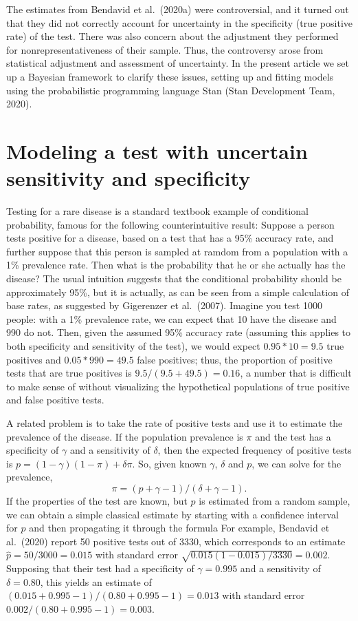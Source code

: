 \documentclass[11pt]{article}
\begin{document}
The estimates from Bendavid et al.\ (2020a) were controversial, and it turned out that they did not correctly account for uncertainty in the specificity (true positive rate) of the test.  There was also concern about the adjustment they performed for nonrepresentativeness of their sample.  Thus, the controversy arose from statistical adjustment and assessment of uncertainty.  In the present article we set up a Bayesian framework to clarify these issues, setting up and fitting models using the probabilistic programming language Stan (Stan Development Team, 2020).


\section{Modeling a test with uncertain sensitivity and specificity}\label{model1}

Testing for a rare disease is a standard textbook example of conditional probability, famous for the following counterintuitive result:  Suppose a person tests positive for a disease, based on a test that has a 95\% accuracy rate, and further suppose that this person is sampled at ramdom from a population with a 1\% prevalence rate.  Then what is the probability that he or she actually has the disease? The usual intuition suggests that the conditional probability should be approximately 95\%, but it is actually, as can be seen from a simple calculation of base rates, as suggested by Gigerenzer et al.\ (2007).  Imagine you test 1000  people:  with a 1\% prevalence rate, we can expect that 10 have the disease and 990 do not.  Then, given the assumed 95\% accuracy rate (assuming this applies to both specificity and sensitivity of the test), we would expect $0.95*10=9.5$ true positives and $0.05*990 =  49.5$ false positives; thus, the proportion of positive tests that are true positives is $9.5/(9.5+49.5) = 0.16$, a number that is difficult to make sense of without visualizing the hypothetical populations of true positive and false positive tests.

A related problem is to take the rate of positive tests and use it to estimate the prevalence of the disease.  If the population prevalence is $\pi$ and the test has a specificity of $\gamma$ and a sensitivity of $\delta$, then the expected frequency of positive tests is $p=(1-\gamma)(1- \pi)+ \delta\pi$.  So, given known $\gamma$, $\delta$ and $p$, we can solve for the prevalence,
\begin{equation}\label{solve}
  \pi=(p + \gamma - 1)/(\delta + \gamma - 1).
  \end{equation}
  If the properties of the test are known, but $p$ is estimated from a random sample, we can obtain a simple classical estimate by starting with a confidence interval for $p$ and then propagating it through the formula  For example, Bendavid et al.\ (2020) report 50 positive tests out of 3330, which corresponds to an estimate  $\hat{p}=50/3000=0.015$ with standard error $\sqrt{0.015(1-0.015)/3330}=0.002$.  Supposing that their test had a specificity of $\gamma=0.995$ and a sensitivity of $\delta=0.80$, this yields an estimate of $(0.015 + 0.995 - 1)/(0.80 + 0.995 -1) = 0.013$ with standard error $0.002/(0.80 + 0.995 -1) = 0.003$.
\end{document}
